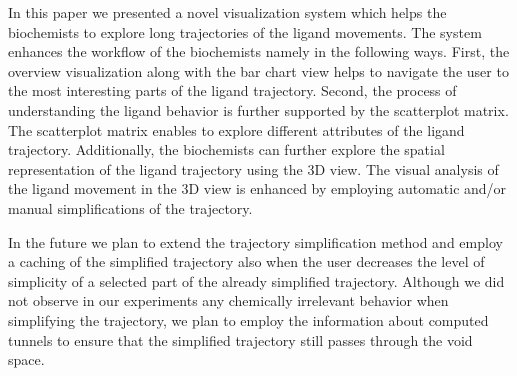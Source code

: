 In this paper we presented a novel visualization system which helps the biochemists to explore long trajectories of the ligand movements.
The system enhances the workflow of the biochemists namely in the following ways.
First, the overview visualization along with the bar chart view helps to navigate the user to the most interesting parts of the ligand trajectory.
Second, the process of understanding the ligand behavior is further supported by the scatterplot matrix.
The scatterplot matrix enables to explore different attributes of the ligand trajectory.
Additionally, the biochemists can further explore the spatial representation of the ligand trajectory using the 3D view.
The visual analysis of the ligand movement in the 3D view is enhanced by employing automatic and/or manual simplifications of the trajectory.

In the future we plan to extend the trajectory simplification method and employ a caching of the simplified trajectory also when the user decreases the level of simplicity of a selected part of the already simplified trajectory.
Although we did not observe in our experiments any chemically irrelevant behavior when simplifying the trajectory, we plan to employ the information about computed tunnels to ensure that the simplified trajectory still passes through the void space.
